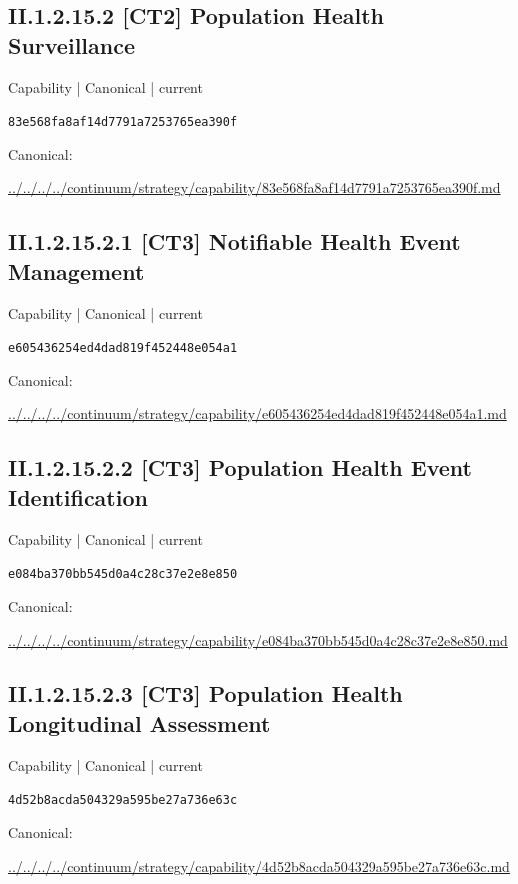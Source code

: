 \documentclass[10pt,a4paper]{article}
\begin{document}
\subsection*{II.1.2.15.2 [CT2] Population Health Surveillance}
\label{element-83e568fa8af14d7791a7253765ea390f}
{\small Capability | Canonical | current}\par
\texttt{83e568fa8af14d7791a7253765ea390f}\par
Canonical: \par
{\footnotesize\url{../../../../continuum/strategy/capability/83e568fa8af14d7791a7253765ea390f.md}}\par
\subsection*{II.1.2.15.2.1 [CT3] Notifiable Health Event Management}
\label{element-e605436254ed4dad819f452448e054a1}
{\small Capability | Canonical | current}\par
\texttt{e605436254ed4dad819f452448e054a1}\par
Canonical: \par
{\footnotesize\url{../../../../continuum/strategy/capability/e605436254ed4dad819f452448e054a1.md}}\par
\subsection*{II.1.2.15.2.2 [CT3] Population Health Event Identification}
\label{element-e084ba370bb545d0a4c28c37e2e8e850}
{\small Capability | Canonical | current}\par
\texttt{e084ba370bb545d0a4c28c37e2e8e850}\par
Canonical: \par
{\footnotesize\url{../../../../continuum/strategy/capability/e084ba370bb545d0a4c28c37e2e8e850.md}}\par
\subsection*{II.1.2.15.2.3 [CT3] Population Health Longitudinal Assessment}
\label{element-4d52b8acda504329a595be27a736e63c}
{\small Capability | Canonical | current}\par
\texttt{4d52b8acda504329a595be27a736e63c}\par
Canonical: \par
{\footnotesize\url{../../../../continuum/strategy/capability/4d52b8acda504329a595be27a736e63c.md}}\par
\end{document}
